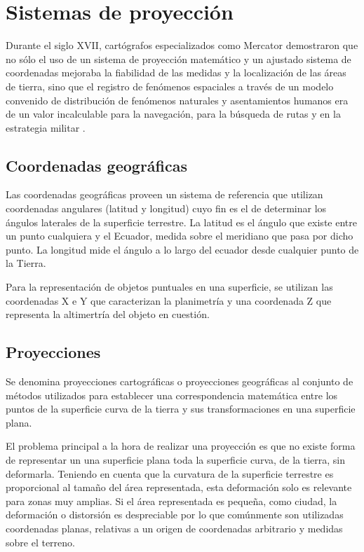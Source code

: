 \section{Sistemas de proyección}
\label{sec:cap2-sistemas-de-proyeccion}

Durante el siglo XVII, cartógrafos especializados como Mercator demostraron que no sólo el uso de un sistema de
proyección matemático y un ajustado sistema de coordenadas mejoraba la fiabilidad de las medidas y la localización
de las áreas de tierra, sino que el registro de fenómenos espaciales a través de un modelo convenido de
distribución de fenómenos naturales y asentamientos humanos era de un valor incalculable para la navegación, para
la búsqueda de rutas y en la estrategia militar \cite{llopis2006sistemas}.

\subsection{Coordenadas geográficas}
Las coordenadas geográficas proveen un sistema de referencia que utilizan coordenadas angulares (latitud y
longitud) cuyo fin es el de determinar los ángulos laterales de la superficie terrestre. La latitud es el ángulo
que existe entre un punto cualquiera y el Ecuador, medida sobre el meridiano que pasa por dicho punto. La longitud
mide el ángulo a lo largo del ecuador desde cualquier punto de la Tierra.

Para la representación de objetos puntuales en una superficie, se utilizan las coordenadas X e Y que caracterizan
la planimetría y una coordenada Z que representa la altimertría del objeto en cuestión. 

\subsection{Proyecciones}
Se denomina proyecciones cartográficas o proyecciones geográficas al conjunto de métodos utilizados para establecer
una correspondencia matemática entre los puntos de la superficie curva de la tierra y sus transformaciones en una
superficie plana. 

El problema principal a la hora de realizar una proyección es que no existe forma de representar un una superficie
plana toda la superficie curva, de la tierra, sin deformarla. Teniendo en cuenta que la curvatura de la superficie
terrestre es proporcional al tamaño del área representada, esta deformación solo es relevante para zonas muy
amplias. Si el área representada es pequeña, como ciudad, la deformación o distorsión es despreciable por lo que
comúnmente son utilizadas coordenadas planas, relativas a un origen de coordenadas arbitrario y medidas sobre el
terreno.

